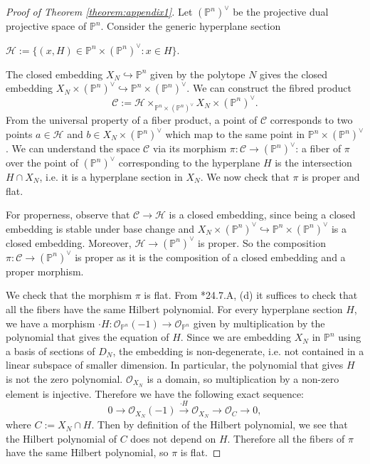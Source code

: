\documentclass[11pt]{article} %
\theoremstyle{definition}
\renewcommand{\P}{{\mathbb P}}
\newcommand{\cH}{{\mathcal{H}}}
\newcommand{\cC}{{\mathcal{C}}}
\newcommand{\cO}{{\mathcal{O}}}
\begin{document}
\begin{proof}[Proof of Theorem \ref{theorem:appendix1}]
 Let $(\mathbb{P}^n)^\vee$ be the projective dual projective space of $\mathbb{P}^n$. Consider the generic hyperplane section  \begin{center}
    $\cH := \{(x,H)\in \mathbb{P}^n\times (\mathbb{P}^n)^\vee: x \in H\}.$
\end{center}
The closed embedding $X_N \hookrightarrow \mathbb{P}^n$ given by the polytope $N$ gives the closed embedding $X_N \times (\mathbb{P}^n)^\vee \hookrightarrow \mathbb{P}^n \times(\mathbb{P}^n)^\vee$. We can construct the fibred product $$\cC:= \cH\times_{\mathbb{P}^n\times (\mathbb{P}^n)^\vee}X_N \times (\mathbb{P}^n)^\vee.$$
From the universal property of a fiber product, a point of $\cC$ corresponds to two points $a\in \mathcal{H}$ and $b \in X_N \times (\mathbb{P}^n)^\vee$ which map to the same point in $\mathbb{P}^n\times (\mathbb{P}^n)^\vee$. We can understand the space $\cC$ via its morphism $\pi:\cC \to (\mathbb{P}^n)^\vee$: a fiber of $\pi $ over the point of $(\mathbb{P}^n)^\vee$ corresponding to the hyperplane $H$ is the intersection $H\cap X_N$, i.e. it is a hyperplane section in $X_N$. We now check that $\pi$ is proper and flat.

For properness, observe that $\cC \to \cH$ is a closed embedding, since being a closed embedding is stable under base change and $X_N \times (\mathbb{P}^n)^\vee \hookrightarrow \mathbb{P}^n \times(\mathbb{P}^n)^\vee$ is a closed embedding. Moreover, $\cH \to (\mathbb{P}^n)^\vee$ is proper. So the composition $\pi:\cC \to (\mathbb{P}^n)^\vee$ is proper as it is the composition of a closed embedding and a proper morphism.


We check that the morphism $\pi$ is flat. From \cite{Vak17}*{24.7.A, (d)} it suffices to check that all the fibers have the same Hilbert polynomial.
For every hyperplane section $H$, we have a morphism $\cdot H:\cO_{\mathbb{P}^n}(-1)\to \cO_{\mathbb{P}^n}$ given by  multiplication by the polynomial that gives the equation of $H$. Since we are embedding $X_N$ in $\P^n$ using a basis of sections of $D_N$, the embedding is non-degenerate, i.e. not contained in a linear subspace of smaller dimension. In particular, the polynomial that gives $H$ is not the zero polynomial.  $\cO_{X_{N}}$ is a domain, so multiplication by a non-zero element is injective. Therefore we have the following exact sequence: 
$$0 \to \cO_{X_N}(-1)\xrightarrow{\cdot H} \cO_{X_N}\to \cO_C \to 0,$$
where $C:=X_N\cap H$. Then by definition of the Hilbert polynomial, we see that the Hilbert polynomial of $C$ does not depend on $H$. Therefore all the fibers of $\pi$ have the same Hilbert polynomial, so $\pi$ is flat.



\end{proof}
\end{document}
